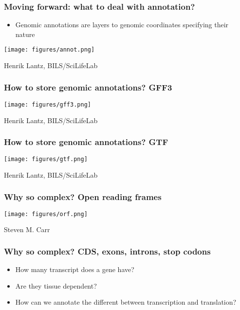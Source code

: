 \documentclass{beamer}
\begin{document}
\begin{frame}
  \frametitle{Moving forward: what to deal with annotation?}
  \begin{itemize}
  \item Genomic annotations are layers to genomic coordinates specifying their nature
  \end{itemize}
\centering
\texttt{[image: figures/annot.png]}

Henrik Lantz, BILS/SciLifeLab
\end{frame}


\begin{frame}
  \frametitle{How to store genomic annotations? GFF3}
  
\centering
\texttt{[image: figures/gff3.png]}

Henrik Lantz, BILS/SciLifeLab
\end{frame}



\begin{frame}
  \frametitle{How to store genomic annotations? GTF}
  
\centering
\texttt{[image: figures/gtf.png]}

Henrik Lantz, BILS/SciLifeLab
\end{frame}



\begin{frame}
  \frametitle{Why so complex? Open reading frames}
  
\centering
\texttt{[image: figures/orf.png]}

Steven M. Carr 
\end{frame}


\begin{frame}
  \frametitle{Why so complex? CDS, exons, introns, stop codons}
  \begin{itemize}
  \item How many transcript does a gene have?
  \item Are they tissue dependent?
  \item How can we annotate the different between transcription and translation?
  \end{itemize}

\end{frame}
\end{document}
